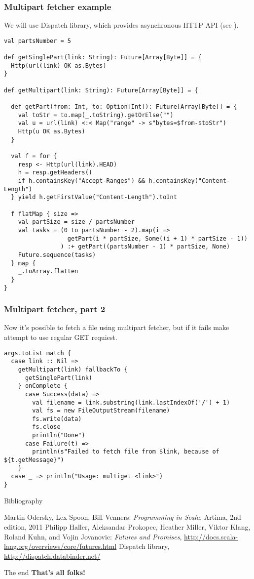 \documentclass{beamer}
\begin{document}
\begin{frame}[fragile]
\frametitle{Multipart fetcher example}
We will use Dispatch library, which provides asynchronous HTTP API (see \cite{dispatch}).
\begin{lstlisting}[name=multifetch]
val partsNumber = 5

def getSinglePart(link: String): Future[Array[Byte]] = {
  Http(url(link) OK as.Bytes)
}

def getMultipart(link: String): Future[Array[Byte]] = {

  def getPart(from: Int, to: Option[Int]): Future[Array[Byte]] = {
    val toStr = to.map(_.toString).getOrElse("")
    val u = url(link) <:< Map("range" -> s"bytes=$from-$toStr")
    Http(u OK as.Bytes)
  }

  val f = for {
    resp <- Http(url(link).HEAD)
    h = resp.getHeaders()
    if h.containsKey("Accept-Ranges") && h.containsKey("Content-Length")
  } yield h.getFirstValue("Content-Length").toInt

  f flatMap { size =>
    val partSize = size / partsNumber
    val tasks = (0 to partsNumber - 2).map(i =>
                  getPart(i * partSize, Some((i + 1) * partSize - 1))
                ) :+ getPart((partsNumber - 1) * partSize, None)
    Future.sequence(tasks)
  } map {
    _.toArray.flatten
  }
}
\end{lstlisting}
\end{frame}

\begin{frame}[fragile]
\frametitle{Multipart fetcher, part 2}
Now it's possible to fetch a file using multipart fetcher, but if it fails make attempt to use
regular GET requiest.
\begin{lstlisting}[name=multifetch]
args.toList match {
  case link :: Nil =>
    getMultipart(link) fallbackTo {
      getSinglePart(link)
    } onComplete {
      case Success(data) =>
        val filename = link.substring(link.lastIndexOf('/') + 1)
        val fs = new FileOutputStream(filename)
        fs.write(data)
        fs.close
        println("Done")
      case Failure(t) =>
        println(s"Failed to fetch file from $link, because of ${t.getMessage}")
    }
  case _ => println("Usage: multiget <link>")
}
\end{lstlisting}
\end{frame}


\begin{frame}{Bibliography}
\begin{thebibliography}{00}
Martin Odersky, Lex Spoon, Bill Venners:
\emph{Programming in Scala},
Artima, 2nd edition, 2011
Philipp Haller, Aleksandar Prokopec, Heather Miller, Viktor Klang, Roland Kuhn, and Vojin Jovanovic:
\emph{Futures and Promises}, \url{http://docs.scala-lang.org/overviews/core/futures.html}
Dispatch library, \url{http://dispatch.databinder.net/}
\end{thebibliography}
\end{frame}

\begin{frame}{The end}
\centering
\textbf{That's all folks!}
\end{frame}
\end{document}
